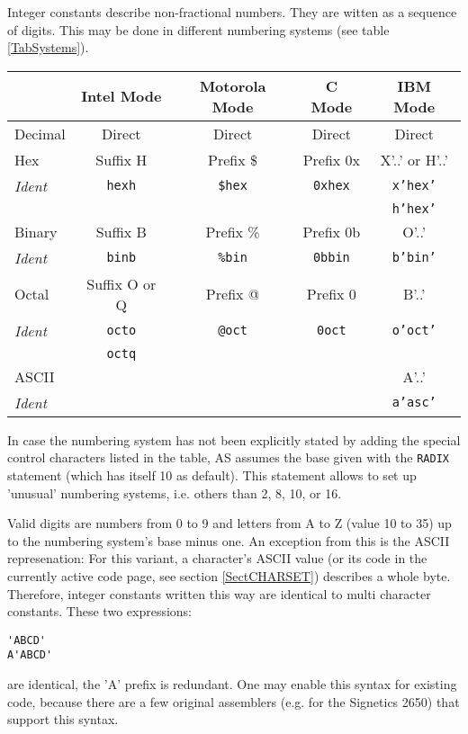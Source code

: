\documentclass[12pt,twoside]{report}
\newcommand{\ii}[1]{{\it #1}}
\newcommand{\tty}[1]{{\tt #1}}
\newcommand{\asname}{{AS}}
\begin{document}
Integer constants describe non-fractional numbers.  They are witten as a
sequence of digits.  This may be done in different numbering systems (see
table \ref{TabSystems}).
\par
\begin{table*}[htb]
\begin{center}\begin{tabular}{|l|c|c|c|c|}
\hline
          & Intel Mode    & Motorola Mode & C Mode    & IBM Mode \\
\hline
\hline
Decimal   & Direct        & Direct      & Direct      & Direct \\
Hex       & Suffix H      & Prefix \$   & Prefix 0x   & X'..' or H'..' \\
\ii{Ident}& \tty{hexh}    & \tty{\$hex} & \tty{0xhex} & \tty{x'hex'} \\
          &               &             &             & \tty{h'hex'} \\
Binary    & Suffix B      & Prefix \%   & Prefix 0b   & O'..' \\
\ii{Ident}& \tty{binb}    & \tty{\%bin} & \tty{0bbin} & \tty{b'bin'} \\
Octal     & Suffix O or Q & Prefix @    & Prefix 0    & B'..' \\
\ii{Ident}& \tty{octo}    & \tty{@oct}  & \tty{0oct}  & \tty{o'oct'} \\  
          & \tty{octq}    &             &             & \\
ASCII     &               &             &             & A'..' \\
\ii{Ident}&               &             &             & \tty{a'asc'} \\
\hline
\end{tabular}\end{center}
\caption{Defined Numbering Systems and Notations\label{TabSystems}}
\end{table*}
In case the numbering system has not been explicitly stated by adding the
special control characters listed in the table, \asname{} assumes the base given
with the {\tt RADIX} statement (which has itself 10 as default).  This
statement allows to set up 'unusual' numbering systems, i.e. others than
2, 8, 10, or 16.

Valid digits are numbers from 0 to 9 and letters from A to Z (value 10 to
35) up to the numbering system's base minus one. An exception from this is
the ASCII represenation: For this variant, a character's ASCII value (or its
code in the currently active code page, see section \ref{SectCHARSET})
describes a whole byte.  Therefore, integer constants written this way
are identical to multi character constants.  These two expressions:
\begin{verbatim}
'ABCD'
A'ABCD'
\end{verbatim}
are identical, the 'A' prefix is redundant.  One may enable this syntax
for existing code, because there are a few original assemblers (e.g.
for the Signetics 2650) that support this syntax. 
\end{document}
